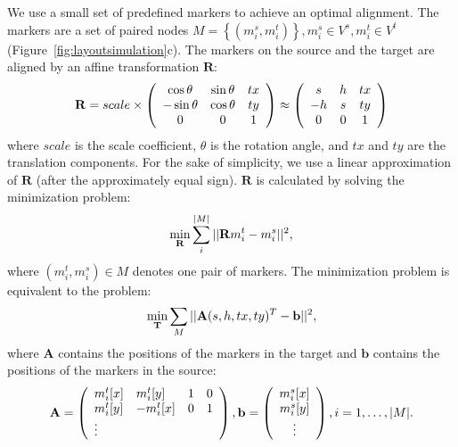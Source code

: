 We use a small set of predefined markers to achieve an optimal alignment. 
The markers are a set of paired nodes $M = \left\{(m^s_i, m^t_i)\right\}, m^s_i \in V^s, m^t_i \in V^t$ (Figure~\ref{fig:layoutsimulation}c). The markers on the source and the target are aligned by an affine transformation $\mathbf{R}$:
\begin{equation}
    \setlength{\abovedisplayskip}{5pt}
    \setlength{\abovedisplayshortskip}{5pt}
    \setlength{\belowdisplayshortskip}{5pt}
    \setlength{\belowdisplayskip}{5pt}
    \mathbf{R} = scale \times \left(\begin{array}{ccc}
        \cos \theta & \sin \theta & tx \\
        -\sin \theta & \cos \theta & ty \\
        0 & 0 & 1
        \end{array}\right) \approx \left(\begin{array}{ccc}
        s & h & tx \\
        -h & s & ty \\
        0 & 0 & 1
        \end{array}\right) \label{eq:transformation}
\end{equation}
where $scale$ is the scale coefficient, $\theta$ is the rotation angle, and $tx$ and $ty$ are the translation components. For the sake of simplicity, we use a linear approximation of $\mathbf{R}$ (after the approximately equal sign).
$\mathbf{R}$ is calculated by solving the minimization problem:
\begin{equation}
    \setlength{\abovedisplayskip}{5pt}
    \setlength{\abovedisplayshortskip}{5pt}
    \setlength{\belowdisplayshortskip}{5pt}
    \setlength{\belowdisplayskip}{5pt}
    \min_{\mathbf{R}} \sum_{i}^{|M|} ||\mathbf{R} m^{t}_i  - m^{s}_i ||^2,
\end{equation}
where $(m^t_i, m^s_i) \in M$ denotes one pair of markers.
The minimization problem is equivalent to the problem:
\begin{equation}
    \setlength{\abovedisplayskip}{5pt}
    \setlength{\abovedisplayshortskip}{5pt}
    \setlength{\belowdisplayshortskip}{5pt}
    \setlength{\belowdisplayskip}{5pt}
    \min_{\mathbf{T}} \sum_{M} ||\mathbf{A} (s, h, tx, ty)^T - \mathbf{b} ||^2,
\end{equation}
where $\mathbf{A}$ contains the positions of the markers in the target and $\mathbf{b}$ contains the positions of the markers in the source:
\begin{equation}
    \setlength{\abovedisplayskip}{5pt}
    \setlength{\abovedisplayshortskip}{5pt}
    \setlength{\belowdisplayshortskip}{5pt}
    \setlength{\belowdisplayskip}{5pt}
    \mathbf{A} = \left(\begin{array}{llll}
    {m^t_i}[x] & {m^t_i}[y] & 1 & 0 \\
    {m^t_i}[y] & -{m^t_i}[x] & 0 & 1 \\
    \vdots
    \end{array}\right), \mathbf{b} = \left(\begin{array}{c}
        {m^s_i}[x] \\
        {m^s_i}[y] \\
        \vdots
    \end{array}\right), i=1,\ldots,|M|.
\end{equation}
